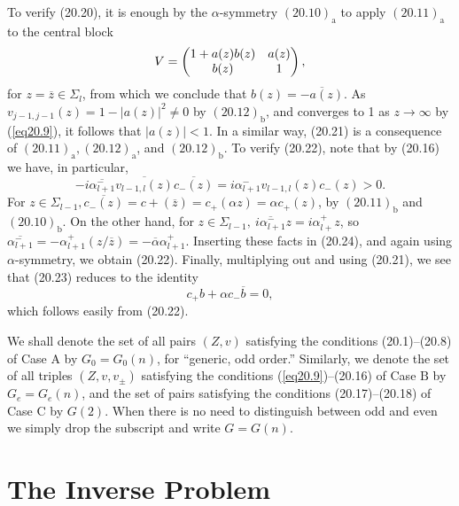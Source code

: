 \documentclass{surv-l}
\theoremstyle{plain}
\theoremstyle{definition}
\numberwithin{equation}{chapter}
\begin{document}
To verify (20.20), it is enough by the $\alpha$-symmetry $\mathrm{(20.10)_{a}}$ to apply $\mathrm{(20.11)_{a}}$ to the central block
\begin{equation*}
V=\left(\begin{array}{@{}cc@{}}
1+a(z)b(z) & a(z)\\
  b(z) & 1
\end{array}\right),
\end{equation*}
for $z=\overline{z}\in\Sigma_{l}$, from which we conclude that $b(z)=\overline{-a(z)}$. As $v_{j-1,j-1}(z)= 1-|a(z)|^{2}\neq 0$ by $\mathrm{(20.12)_{b}}$, and converges to 1 as $ z\rightarrow\infty$ by (\ref{eq20.9}), it follows that $|a(z)|<1$. In a similar way, (20.21) is a consequence of $\mathrm{(20.11)_{a},(20.12)_{a}}$, and $\mathrm{(20.12)_{b}}$. To verify (20.22), note that by (20.16) we have, in particular,
\begin{equation*}
-i\overline{\alpha_{l+1}^{-}}\overline{v_{l-1,l}(z)}\overline{c_{-}(z)}=i\alpha_{l+1}^{-}v_{l-1,l}(z)c_{-}(z)>0.
\end{equation*}
For $z\in\Sigma_{l-1},\overline{c_{-}(z)}=c+(\overline{z})=c_{+}(\alpha z)=\alpha c_{+}(z)$, by $\mathrm{(20.11)_{b}}$ and $\mathrm{(20.10)_{b}}$. On the other hand, for $z\in\Sigma_{l-1},\ \overline{i\alpha_{l+1}^{-}}z=i\alpha_{l+}^{+}z$, so $\overline{\alpha_{l+1}^{-}}=-\alpha_{l+1}^{+}(z/\overline{z})=-\overline{\alpha}\alpha_{l+1}^{+}$. Inserting these facts in (20.24), and again using $\alpha$-symmetry, we obtain (20.22). Finally, multiplying out and using (20.21), we see that (20.23) reduces to the identity
\begin{equation*}
c_{+}b+\alpha c_{-}\overline{b}=0,
\end{equation*}
which follows easily from (20.22).

We shall denote the set of all pairs $(Z, v)$ satisfying the
conditions (20.1)--(20.8) of Case A by $G_{0}=G_{0}(n)$, for ``generic, odd order.'' Similarly, we denote the set of all triples $(Z, v, v_{\pm})$ satisfying the conditions (\ref{eq20.9})--(20.16) of Case $\mathrm{B}$ by $G_{e}=G_{e}(n)$, and the set of pairs satisfying the conditions (20.17)--(20.18) of Case C by $G(2)$. When there is no need to distinguish between odd and even we simply drop the subscript and write $G=G(n)$.

\part{The Inverse Problem}
\end{document}
